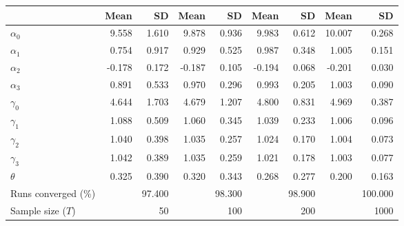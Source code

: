
\begin{tabular}[t]{lrrrrrrrr}
\toprule
  & Mean & SD & Mean  & SD  & Mean   & SD   & Mean    & SD   \\
\midrule
$\alpha_{0}$ & 9.558 & 1.610 & 9.878 & 0.936 & 9.983 & 0.612 & 10.007 & 0.268\\
$\alpha_{1}$ & 0.754 & 0.917 & 0.929 & 0.525 & 0.987 & 0.348 & 1.005 & 0.151\\
$\alpha_{2}$ & -0.178 & 0.172 & -0.187 & 0.105 & -0.194 & 0.068 & -0.201 & 0.030\\
$\alpha_{3}$ & 0.891 & 0.533 & 0.970 & 0.296 & 0.993 & 0.205 & 1.003 & 0.090\\
$\gamma_{0}$ & 4.644 & 1.703 & 4.679 & 1.207 & 4.800 & 0.831 & 4.969 & 0.387\\
$\gamma_{1}$ & 1.088 & 0.509 & 1.060 & 0.345 & 1.039 & 0.233 & 1.006 & 0.096\\
$\gamma_{2}$ & 1.040 & 0.398 & 1.035 & 0.257 & 1.024 & 0.170 & 1.004 & 0.073\\
$\gamma_{3}$ & 1.042 & 0.389 & 1.035 & 0.259 & 1.021 & 0.178 & 1.003 & 0.077\\
$\theta$ & 0.325 & 0.390 & 0.320 & 0.343 & 0.268 & 0.277 & 0.200 & 0.163\\
Runs converged (\%) &  & 97.400 &  & 98.300 &  & 98.900 &  & 100.000\\
Sample size ($T$) &  & 50 &  & 100 &  & 200 &  & 1000\\
\bottomrule
\end{tabular}
